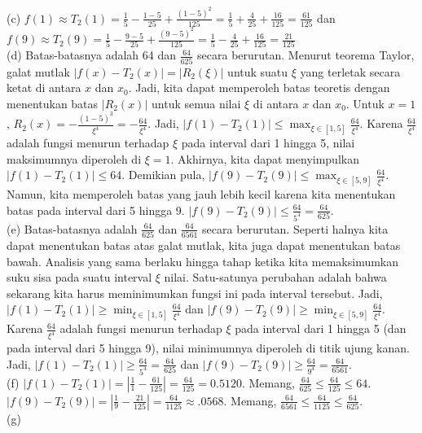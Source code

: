 \begin{description}
(c) $f(1)\approx T_{2}(1)=\frac{1}{5}-\frac{1-5}{25}+\frac{(1-5)^{2}}{125}=\frac{1}{5}+\frac{4}{25}+\frac{16}{125}=\frac{61}{125}$
dan $f(9)\approx T_{2}(9)=\frac{1}{5}-\frac{9-5}{25}+\frac{(9-5)^{2}}{125}=\frac{1}{5}-\frac{4}{25}+\frac{16}{125}=\frac{21}{125}$\\
(d) Batas-batasnya adalah 64 dan $\frac{64}{625}$ secara berurutan.
Menurut teorema Taylor, galat mutlak $|f(x)-T_{2}(x)|=|R_{2}(\xi)|$
untuk suatu $\xi$ yang terletak secara ketat di antara $x$ dan $x_{0}$.
Jadi, kita dapat memperoleh batas teoretis dengan menentukan batas
$|R_{2}(x)|$ untuk semua nilai $\xi$ di antara $x$ dan $x_{0}$.
Untuk $x=1$, $R_{2}(x)=-\frac{(1-5)^{3}}{\xi^{4}}=-\frac{64}{\xi^{4}}$.
Jadi, $|f(1)-T_{2}(1)|\leq{\displaystyle \max_{\xi\in[1,5]}\frac{64}{\xi^{4}}}$.
Karena $\frac{64}{\xi^{4}}$ adalah fungsi menurun terhadap $\xi$
pada interval dari 1 hingga 5, nilai maksimumnya diperoleh di $\xi=1$.
Akhirnya, kita dapat menyimpulkan $|f(1)-T_{2}(1)|\leq64$. Demikian
pula, $|f(9)-T_{2}(9)|\leq{\displaystyle \max_{\xi\in[5,9]}\frac{64}{\xi^{4}}}$.
Namun, kita memperoleh batas yang jauh lebih kecil karena kita menentukan
batas pada interval dari 5 hingga 9. $|f(9)-T_{2}(9)|\leq\frac{64}{5^{4}}=\frac{64}{625}$.\\
(e) Batas-batasnya adalah $\frac{64}{625}$ dan $\frac{64}{6561}$
secara berurutan. Seperti halnya kita dapat menentukan batas atas
galat mutlak, kita juga dapat menentukan batas bawah. Analisis yang
sama berlaku hingga tahap ketika kita memaksimumkan suku sisa pada
suatu interval $\xi$ nilai. Satu-satunya perubahan adalah bahwa sekarang
kita harus meminimumkan fungsi ini pada interval tersebut. Jadi, $|f(1)-T_{2}(1)|\geq{\displaystyle \min_{\xi\in[1,5]}\frac{64}{\xi^{4}}}$
dan $|f(9)-T_{2}(9)|\geq{\displaystyle \min_{\xi\in[5,9]}\frac{64}{\xi^{4}}}$.
Karena $\frac{64}{\xi^{4}}$ adalah fungsi menurun terhadap $\xi$
pada interval dari 1 hingga 5 (dan pada interval dari 5 hingga 9),
nilai minimumnya diperoleh di titik ujung kanan. Jadi, $|f(1)-T_{2}(1)|\geq\frac{64}{5^{4}}=\frac{64}{625}$
dan $|f(9)-T_{2}(9)|\geq\frac{64}{9^{4}}=\frac{64}{6561}$.\\
(f) $|f(1)-T_{2}(1)|=\left|\frac{1}{1}-\frac{61}{125}\right|=\frac{64}{125}=0.5120$.
Memang, $\frac{64}{625}\leq\frac{64}{125}\leq64$. $|f(9)-T_{2}(9)|=\left|\frac{1}{9}-\frac{21}{125}\right|=\frac{64}{1125}\approx.0568$.
Memang, $\frac{64}{6561}\leq\frac{64}{1125}\leq\frac{64}{625}$.\\
(g) $\ $


\end{description}
